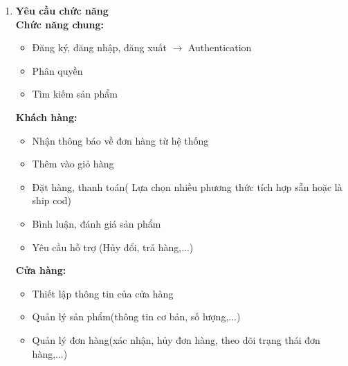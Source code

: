                 \begin{enumerate}[label=\arabic{section}.\arabic{subsection}.\arabic{subsubsection}.\alph*,leftmargin=3cm]
                    \item \textbf{Yêu cầu chức năng} \\
                        \textbf{Chức năng chung:}
                        \begin{itemize}
                            \item Đăng ký, đăng nhập, đăng xuất $\rightarrow$ 
                            Authentication
                            \item Phân quyền
                            \item Tìm kiếm sản phẩm
                        \end{itemize}
    
                        \textbf{Khách hàng:}
                        \begin{itemize}
                            \item Nhận thông báo về đơn hàng từ hệ thống
                            \item Thêm vào  giỏ hàng
                            \item Đặt hàng, thanh toán( Lựa chọn nhiều phương thức tích hợp sẵn hoặc là ship cod)
                            \item Bình luận, đánh giá sản phẩm
                            \item Yêu cầu hỗ trợ (Hủy đổi, trả hàng,...)
                        \end{itemize}

                        \textbf{Cửa hàng:}
                        \begin{itemize}
                            \item Thiết lập thông tin của cửa hàng
                            \item Quản lý sản phẩm(thông tin cơ bản, số lượng,...)
                            \item Quản lý đơn hàng(xác nhận, hủy đơn hàng, theo dõi trạng thái đơn hàng,...)
                        \end{itemize}


\end{enumerate}
